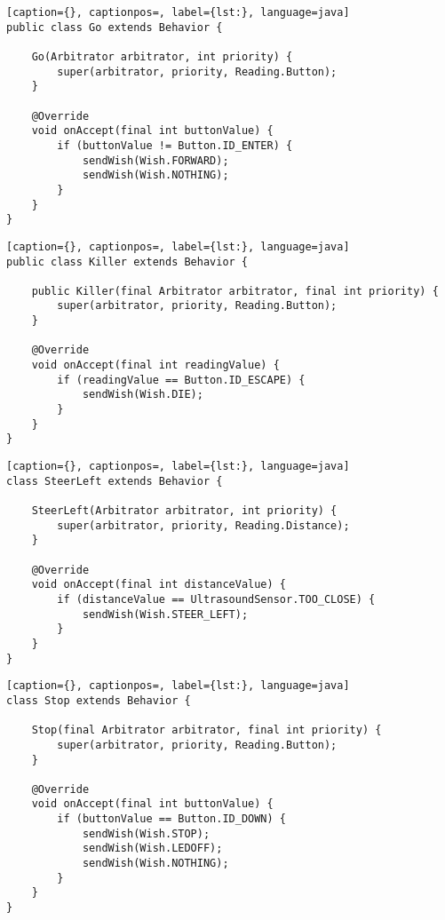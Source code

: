 \begin{lstlisting}[caption={}, captionpos=, label={lst:}, language=java]
public class Go extends Behavior {

	Go(Arbitrator arbitrator, int priority) {
		super(arbitrator, priority, Reading.Button);
	}

	@Override
	void onAccept(final int buttonValue) {
		if (buttonValue != Button.ID_ENTER) {
			sendWish(Wish.FORWARD);
			sendWish(Wish.NOTHING);
		}
	}
}
\end{lstlisting}

\begin{lstlisting}[caption={}, captionpos=, label={lst:}, language=java]
public class Killer extends Behavior {

	public Killer(final Arbitrator arbitrator, final int priority) {
		super(arbitrator, priority, Reading.Button);
	}

	@Override
	void onAccept(final int readingValue) {
		if (readingValue == Button.ID_ESCAPE) {
			sendWish(Wish.DIE);
		}
	}
}
\end{lstlisting}

\begin{lstlisting}[caption={}, captionpos=, label={lst:}, language=java]
class SteerLeft extends Behavior {

    SteerLeft(Arbitrator arbitrator, int priority) {
        super(arbitrator, priority, Reading.Distance);
    }

    @Override
    void onAccept(final int distanceValue) {
        if (distanceValue == UltrasoundSensor.TOO_CLOSE) {
            sendWish(Wish.STEER_LEFT);
        }
    }
}
\end{lstlisting}

\begin{lstlisting}[caption={}, captionpos=, label={lst:}, language=java]
class Stop extends Behavior {

    Stop(final Arbitrator arbitrator, final int priority) {
        super(arbitrator, priority, Reading.Button);
    }

    @Override
    void onAccept(final int buttonValue) {
        if (buttonValue == Button.ID_DOWN) {
            sendWish(Wish.STOP);
            sendWish(Wish.LEDOFF);
            sendWish(Wish.NOTHING);
        }
    }
}
\end{lstlisting}


